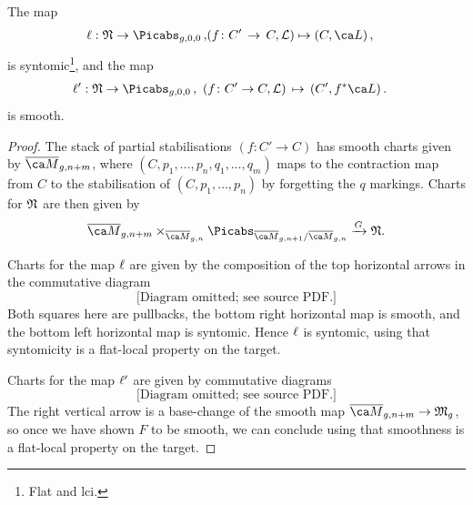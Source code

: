 \begin{lemma}
\notready\label{lem:lflatness}
The map
\begin{eqnarray*}
\targetmap: \frak N \to \Picabs_{g,0,0}\, ,  & (f \colon C' \, \to\,  C, \mathcal{L}) \mapsto (C,\ca L)\, ,
\end{eqnarray*}
is syntomic\footnote{Flat and lci. }, and the map
\begin{eqnarray*}
\sourcemap: \frak N \to \Picabs_{g,0,0}\, , & \ \,(f \colon C' \to C, \mathcal{L})\,  \mapsto\,  (C',f^*\ca L)\,.
\end{eqnarray*}
is smooth.
\end{lemma}
\begin{proof}
The stack of partial stabilisations $(f\colon C' \to C)$ has smooth charts given by $\Mbar_{g,n+m}$, where $(C, p_1, \dots, p_n, q_1, \dots, q_m)$ maps to the contraction map from $C$ to the stabilisation of $(C, p_1, \dots, p_n)$ by forgetting the $q$ markings. Charts for $\frak N$ are then given by
\[\Mbar_{g,n+m} \times_{\Mbar_{g,n}} \Picabs_{\Mbar_{g,n+1}/\Mbar_{g,n}} \xrightarrow{G} \frak N.\]

Charts for the map $\ell$ are given by the composition of the top horizontal arrows in the commutative diagram
\begin{equation}
\text{[Diagram omitted; see source PDF.]}
\end{equation}
Both squares here are pullbacks, the bottom right horizontal map is smooth, and the bottom left horizontal map is syntomic. Hence $\ell$ is syntomic, using that syntomicity is a flat-local property on the target.

Charts for the map $\ell'$ are given by commutative diagrams
\begin{equation}
\text{[Diagram omitted; see source PDF.]}
\end{equation}
The right vertical arrow is a base-change of the smooth map $\Mbar_{g,n+m} \to \frak{M}_g$, so once we have shown $F$ to be smooth, we can conclude using that smoothness is a flat-local property on the target.


\end{proof}
